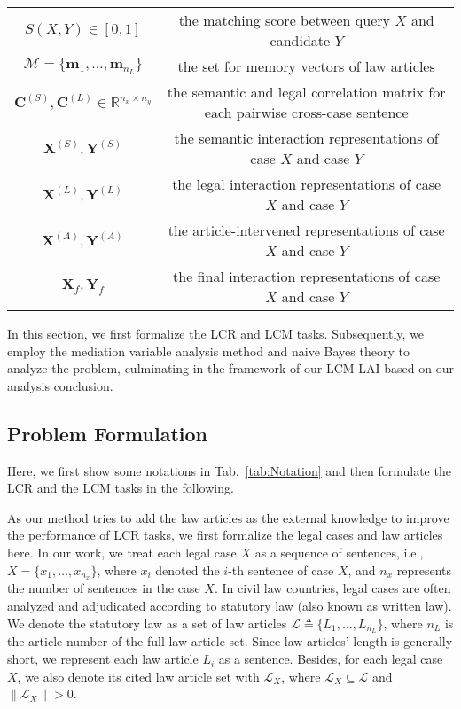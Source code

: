 \begin{table*}[t]
{\begin{tabular}{c|c}
$S(X,Y) \in [0, 1]$ & 
the matching score between query $X$ and candidate $Y$\\

$\mathcal{M} = \{ \textbf{m}_1, \ldots, \textbf{m}_{n_L}\}$ & 
the set for memory vectors of law articles\\

$\mathbf{C}^{(S)}, \mathbf{C}^{(L)} \in \mathbb{R}^{n_x \times n_y}$ & 
the semantic and legal correlation matrix for each pairwise cross-case sentence \\

$\mathbf{X}^{(S)}, \mathbf{Y}^{(S)}$ &
the semantic interaction representations of case $X$ and case $Y$\\

$\mathbf{X}^{(L)}, \mathbf{Y}^{(L)}$ &
the legal interaction representations of case $X$ and case $Y$\\

$\mathbf{X}^{(A)}, \mathbf{Y}^{(A)}$ &
the article-intervened representations of case $X$ and case $Y$\\

$\mathbf{X}_f, \mathbf{Y}_f$ &
the final interaction representations of case $X$ and case $Y$\\

\bottomrule
\end{tabular}%
}
\end{table*}
In this section, we first formalize the LCR and LCM tasks. 
Subsequently, we employ the mediation variable analysis method and naive Bayes theory to analyze the problem, culminating in the framework of our LCM-LAI based on our analysis conclusion.

\subsection{Problem Formulation}
Here, we first show some notations in Tab.~\ref{tab:Notation} and then formulate the LCR and the LCM tasks in the following.

As our method tries to add the law articles as the external knowledge to improve the performance of LCR tasks, we first formalize the legal cases and law articles here.
In our work, we treat each legal case $X$ as a sequence of sentences, i.e., $X = \{ x_1, \ldots, x_{n_x}\}$, where $x_i$ denoted the $i$-th sentence of case $X$, and $n_x$ represents the number of sentences in the case $X$.
In civil law countries, legal cases are often analyzed and adjudicated according to statutory law (also known as written law).
We denote the statutory law as a set of law articles $\mathcal{L}\triangleq\{L_1, \ldots, L_{n_L}\}$, where $n_L$ is the article number of the full law article set. 
Since law articles' length is generally short, we represent each law article $L_i$ as a sentence.
Besides, for each legal case $X$, we also denote its cited law article set with $\mathcal{L}_{X}$, where $\mathcal{L}_{X} \subseteq \mathcal{L}$ and $\|\mathcal{L}_{X}\| > 0$.

